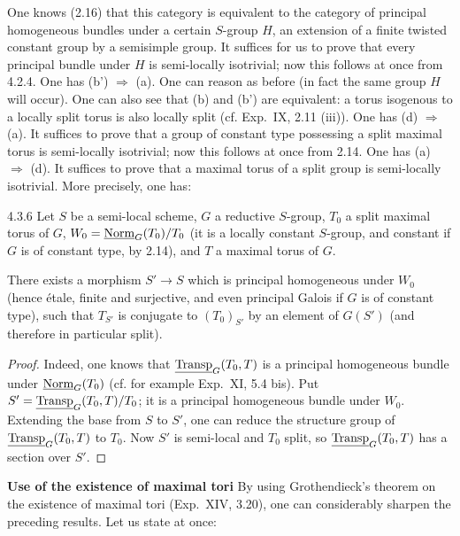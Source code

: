 One knows (2.16) that this category is equivalent to the category of principal homogeneous bundles under a certain $S$-group $H$, an extension of a finite twisted constant group by a semisimple group. It suffices for us to prove that every principal bundle under $H$ is semi-locally isotrivial; now this follows at once from 4.2.4.
\label{XXIV.4.3.3}
One has (b') $\Rightarrow$ (a). One can reason as before (in fact the same group $H$ will occur). One can also see that (b) and (b') are equivalent: a torus isogenous to a locally split torus is also locally split (cf. Exp.~IX, 2.11 (iii)).
\label{XXIV.4.3.4}
One has (d) $\Rightarrow$ (a). It suffices to prove that a group of constant type possessing a split maximal torus is semi-locally isotrivial; now this follows at once from 2.14.
\label{XXIV.4.3.5}
One has (a) $\Rightarrow$ (d). It suffices to prove that a maximal torus of a split group is semi-locally isotrivial. More precisely, one has:
\begin{lemma}{4.3.6}\label{XXIV.4.3.6}
Let $S$ be a semi-local scheme, $G$ a reductive $S$-group, $T_0$ a split maximal torus of $G$, $W_0=\underline{\mathrm{Norm}}_G(T_0)/T_0$ (it is a locally constant $S$-group, and constant if $G$ is of constant type, by 2.14), and $T$ a maximal torus of $G$.

There exists a morphism $S'\to S$ which is principal homogeneous under $W_0$ (hence étale, finite and surjective, and even principal Galois if $G$ is of constant type), such that $T_{S'}$ is conjugate to $(T_0)_{S'}$ by an element of $G(S')$ (and therefore in particular split).
\end{lemma}
\begin{proof}
Indeed, one knows that $\underline{\operatorname{Transp}}_G(T_0,T)$ is a principal homogeneous bundle under $\underline{\mathrm{Norm}}_G(T_0)$ (cf. for example Exp.~XI, 5.4 bis). Put $S'=\underline{\operatorname{Transp}}_G(T_0,T)/T_0$; it is a principal homogeneous bundle under $W_0$. Extending the base from $S$ to $S'$, one can reduce the structure group of $\underline{\operatorname{Transp}}_G(T_0,T)$ to $T_0$. Now $S'$ is semi-local and $T_0$ split, so $\underline{\operatorname{Transp}}_G(T_0,T)$ has a section over $S'$.
\end{proof}
\label{XXIV.4.4}\textbf{Use of the existence of maximal tori}
By using Grothendieck's theorem on the existence of maximal tori (Exp.~XIV, 3.20), one can considerably sharpen the preceding results. Let us state at once:
